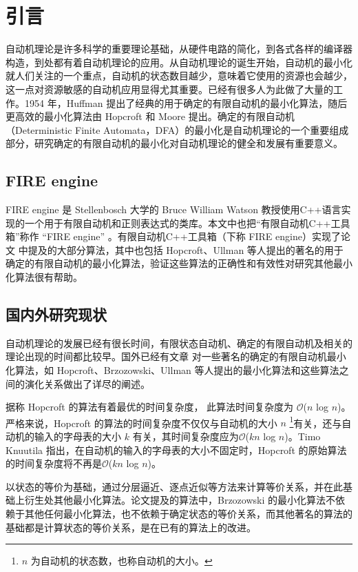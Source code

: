 \chapter{引言}
自动机理论是许多科学的重要理论基础，从硬件电路的简化，到各式各样的编译器构造，到处都有着自动机理论的应用。从自动机理论的诞生开始，自动机的最小化就人们关注的一个重点，自动机的状态数目越少，意味着它使用的资源也会越少，这一点对资源敏感的自动机应用显得尤其重要。已经有很多人为此做了大量的工作。1954 年，Huffman 提出了经典的用于确定的有限自动机的最小化算法\cite{HUFFMAN1954161}，随后更高效的最小化算法由 Hopcroft 和 Moore 提出。确定的有限自动机（Deterministic Finite Automata，DFA）的最小化是自动机理论的一个重要组成部分，研究确定的有限自动机的最小化对自动机理论的健全和发展有重要意义。

\section{FIRE engine}
FIRE engine \cite{watson1994design}是 Stellenbosch 大学的 Bruce William Watson 教授使用C++语言实现的一个用于有限自动机和正则表达式的类库。本文中也把“有限自动机C++工具箱”称作 “FIRE engine” 。有限自动机C++工具箱（下称 FIRE engine）实现了论文 \cite{watson1993taxonomya,watson1993taxonomyb} 中提及的大部分算法，其中也包括 Hopcroft、Ullman 等人提出的著名的用于确定的有限自动机的最小化算法，验证这些算法的正确性和有效性对研究其他最小化算法很有帮助。

\section{国内外研究现状}

自动机理论的发展已经有很长时间，有限状态自动机、确定的有限自动机及相关的理论出现的时间都比较早。国外已经有文章 \cite{watson1993taxonomyb} 对一些著名的确定的有限自动机最小化算法，如 Hopcroft、Brzozowski、Ullman 等人提出的最小化算法和这些算法之间的演化关系做出了详尽的阐述。

据称 Hopcroft 的算法有着最优的时间复杂度， 此算法时间复杂度为 $\mathcal{O}$($n$ log $n$)\cite{Hopc71}。严格来说，Hopcroft 的算法的时间复杂度不仅仅与自动机的大小 $n$ \footnote{ $n$ 为自动机的状态数，也称自动机的大小。}有关，还与自动机的输入的字母表的大小 $k$ 有关，其时间复杂度应为$\mathcal{O}$($kn$ log $n$)。Timo Knuutila 指出，在自动机的输入的字母表的大小不固定时，Hopcroft 的原始算法的时间复杂度将不再是$\mathcal{O}$($kn$ log $n$)\cite{KNUUTILA2001333}。

以状态的等价为基础，通过分层逼近、逐点近似等方法来计算等价关系，并在此基础上衍生处其他最小化算法。论文\cite{watson1993taxonomyb}提及的算法中，Brzozowski 的最小化算法不依赖于其他任何最小化算法，也不依赖于确定状态的等价关系，而其他著名的算法的基础都是计算状态的等价关系，是在已有的算法上的改进\cite{watson1993taxonomyb}。

